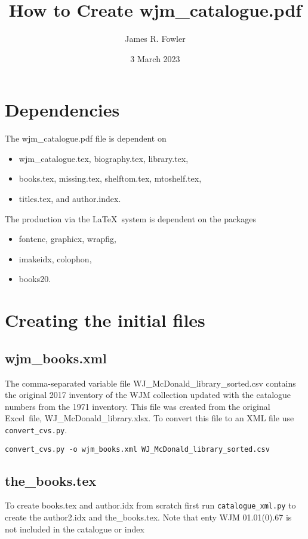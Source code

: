 \documentclass{article}
\begin{document}
\title{How to Create wjm\_catalogue.pdf}
\author{James R. Fowler}
\date{3 March 2023}

\maketitle

\section{Dependencies}

The wjm\_catalogue.pdf file is dependent on
\begin{itemize}
  \item wjm\_catalogue.tex, biography.tex, library.tex,
  \item books.tex, missing.tex, shelftom.tex, mtoshelf.tex,
    \item titles.tex, and author.index.
\end{itemize}

\noindent
The production via the \LaTeX\ system is dependent on the packages
\begin{itemize}
  \item fontenc, graphicx, wrapfig,
  \item imakeidx, colophon,
  \item books20.
\end{itemize}


\section{Creating the initial files}

\subsection{wjm\_books.xml}
The comma-separated variable file WJ\_McDonald\_library\_sorted.csv
contains the original 2017 inventory of the WJM collection updated
with the catalogue numbers from the 1971 inventory. This file was
created from the original Excel\textsuperscript{\texttrademark}\ file,
WJ\_McDonald\_library.xlsx.
To convert this file to an XML file use \texttt{convert\_cvs.py}.
\begin{verbatim}
convert_cvs.py -o wjm_books.xml WJ_McDonald_library_sorted.csv
\end{verbatim}

\subsection{the\_books.tex}
To create books.tex and author.idx from scratch first run
\texttt{catalogue\_xml.py} to create the author2.idx and
the\_books.tex. Note that enty WJM 01.01(0).67 is not included
in the catalogue or index
\end{document}
